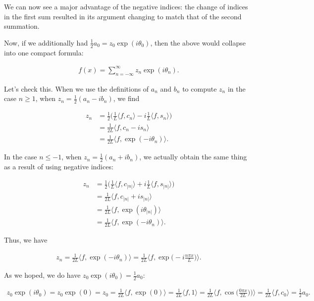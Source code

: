 \documentclass{article}
\begin{document}
We can now see a major advantage of the negative indices: the change of indices in the first sum resulted in its argument changing to match that of the second summation.

Now, if we additionally had $\frac{1}{2} a_0 = z_0 \exp(i\theta_0)$, then the above would collapse into one compact formula:

\begin{align*}
	f(x) = \sum_{n = -\infty}^\infty z_n \exp(i \theta_n).
\end{align*}

Let's check this. When we use the definitions of $a_n$ and $b_n$ to compute $z_n$ in the case $n \geq 1$, when $z_n = \frac{1}{2}(a_n - ib_n)$, we find

\begin{align*}
	z_n &= \frac{1}{2}\Big(\frac{1}{L} \langle f, c_n \rangle - i \frac{1}{L} \langle f, s_n \rangle\Big) \\
	&= \frac{1}{2L} \langle f, c_n - is_n \rangle \\
	&= \frac{1}{2L} \langle f, \exp(-i\theta_n) \rangle.
\end{align*}

In the case $n \leq -1$, when $z_n = \frac{1}{2}(a_n + ib_n)$, we actually obtain the same thing as a result of using negative indices:

\begin{align*}
	z_n &= \frac{1}{2}\Big(\frac{1}{L} \langle f, c_{|n|} \rangle + i \frac{1}{L} \langle f, s_{|n|} \rangle\Big) \\
	&= \frac{1}{2L} \langle f, c_{|n|} + is_{|n|} \rangle \\
	&= \frac{1}{2L} \langle f, \exp(i\theta_{|n|}) \rangle \\
	&= \frac{1}{2L} \langle f, \exp(-i\theta_n) \rangle.
\end{align*}

Thus, we have

\begin{align*}
	z_n = \frac{1}{2L} \langle f, \exp(-i\theta_n) \rangle = \frac{1}{2L} \Big\langle f, \exp\Big(-i\frac{n\pi x}{L}\Big) \Big\rangle.
\end{align*}

As we hoped, we do have $z_0 \exp(i\theta_0) = \frac{1}{2} a_0$:

\begin{align*}
	z_0 \exp(i\theta_0) = z_0 \exp(0) = z_0 = \frac{1}{2L} \langle f, \exp(0) \rangle = \frac{1}{2L} \langle f, 1 \rangle 
	= \frac{1}{2L} \langle f, \cos\Big(\frac{0\pi x}{2L}\Big)) \rangle = \frac{1}{2L} \langle f, c_0 \rangle = \frac{1}{2} a_0.
\end{align*}
\end{document}

